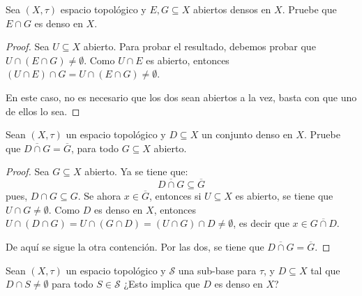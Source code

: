 \documentclass[12pt]{report}
\theoremstyle{largebreak}
\newcommand{\Cls}[1]{\ensuremath{\overline{#1}}}
\begin{document}
    \begin{excer}
        Sea $(X,\tau)$ espacio topológico y $E,G\subseteq X$ abiertos densos en $X$. Pruebe que $E\cap G$ es denso en $X$.
    \end{excer}

    \begin{proof}
        Sea $U\subseteq X$ abierto. Para probar el resultado, debemos probar que $U\cap (E\cap G)\neq\emptyset$. Como $U\cap E$ es abierto, entonces $(U\cap E)\cap G=U\cap (E\cap G)\neq\emptyset$.

        En este caso, no es necesario que los dos sean abiertos a la vez, basta con que uno de ellos lo sea.
    \end{proof}

    \begin{excer}
        Sean $(X,\tau)$ un espacio topológico y $D\subseteq X$ un conjunto denso en $X$. Pruebe que $\Cls{D\cap G}=\Cls{G}$, para todo $G\subseteq X$ abierto.
    \end{excer}

    \begin{proof}
        Sea $G\subseteq X$ abierto. Ya se tiene que:
        \begin{equation*}
            \Cls{D\cap G}\subseteq\Cls{G}
        \end{equation*}
        pues, $D\cap G\subseteq G$. Se ahora $x\in\Cls{G}$, entonces si $U\subseteq X$ es abierto, se tiene que $U\cap G\neq\emptyset$. Como $D$ es denso en $X$, entonces $U\cap(D\cap G)=U\cap(G\cap D)=(U\cap G)\cap D\neq\emptyset$, es decir que $x\in\Cls{G\cap D}$.

        De aquí se sigue la otra contención. Por las dos, se tiene que $\Cls{D\cap G}=\Cls{G}$.
    \end{proof}

    \begin{excer}
        Sean $(X,\tau)$ un espacio topológico y $\mathcal{S}$ una sub-base para $\tau$, y $D\subseteq X$ tal que $D\cap S\neq\emptyset$ para todo $S\in\mathcal{S}$ ¿Esto implica que $D$ es denso en $X$?
    \end{excer}
\end{document}
